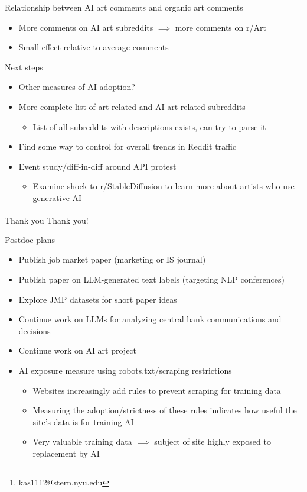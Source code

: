 \documentclass[aspectratio=169]{beamer}
\begin{document}
\begin{frame}{Relationship between AI art comments and organic art comments}
	\centering
	\resizebox*{!}{4cm}{
		
	}
	\begin{itemize}
		\item More comments on AI art subreddits $\implies$ more comments on r/Art
		\item Small effect relative to average comments
	\end{itemize}
\end{frame}

\begin{frame}{Next steps}
	\begin{itemize}
		\item Other measures of AI adoption?
		\item More complete list of art related and AI art related subreddits
			\begin{itemize}
				\item List of all subreddits with descriptions exists,
					can try to parse it
			\end{itemize}
		\item Find some way to control for overall trends in Reddit traffic
		\item Event study/diff-in-diff around API protest
			\begin{itemize}
				\item Examine shock to r/StableDiffusion to learn more about artists
					who use generative AI
			\end{itemize}
	\end{itemize}
\end{frame}

\begin{frame}{Thank you}
	\centering
	Thank you!\footnote[frame]{kas1112@stern.nyu.edu}
\end{frame}

\begin{frame}{Postdoc plans}
	\begin{itemize}
		\item Publish job market paper
			(marketing or IS journal)
		\item Publish paper on LLM-generated text labels
			(targeting NLP conferences)
		\item Explore JMP datasets for short paper ideas
		\item Continue work on LLMs for analyzing central bank communications and decisions
		\item Continue work on AI art project
		\item AI exposure measure using robots.txt/scraping restrictions
			\begin{itemize}
				\item Websites increasingly add rules to prevent scraping for training data
				\item Measuring the adoption/strictness of these rules indicates how useful
					the site's data is for training AI
				\item Very valuable training data $\implies$ subject of site highly exposed to replacement by AI
			\end{itemize}
	\end{itemize}
\end{frame}
\end{document}
